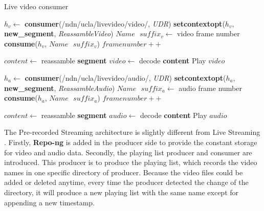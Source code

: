 \begin{algorithm}[hbtp]
\caption{Live video consumer}
\label{alg:liveconsumer}
\begin{algorithmic}[2]
\State $h_v \leftarrow $ \textbf{consumer}(/ndn/ucla/livevideo/video/, \textit{UDR})
\State \textbf{setcontextopt}($h_v$, \textbf{new\_segment}, \textit{ReassambleVideo})
\vspace{0.2cm}
	\State $Name \textbf{ } suffix_v \leftarrow $ video frame number
	\State \textbf{consume}($h_v$, $Name\textbf{ }suffix_v$)
	\State $framenumber ++$
	\EndWhile
\vspace{0.2cm}

    \State $content \leftarrow $ reassamble \textbf{segment}
		\State $video \leftarrow $ decode \textbf{content}
	   	\State Play $video$
	\EndIf
\EndFunction

\vspace{0.4cm}

\State $h_a \leftarrow $ \textbf{consumer}(/ndn/ucla/livevideo/audio/, \textit{UDR})
\State \textbf{setcontextopt}($h_a$, \textbf{new\_segment}, \textit{ReassambleAudio})
\vspace{0.2cm}
	\State $Name \textbf{ } suffix_a \leftarrow $ audio frame number
	\State \textbf{consume}($h_a$, $Name\textbf{ }suffix_a$)
	\State $framenumber ++$
	\EndWhile
\vspace{0.2cm}

    \State $content \leftarrow $ reassamble \textbf{segment}
		\State $audio \leftarrow $ decode \textbf{content}
	   	\State Play $audio$
	\EndIf
\EndFunction
\end{algorithmic}
\end{algorithm}



The Pre-recorded Streaming architecture is slightly different from Live Streaming . Firstly, \textbf{Repo-ng} is added in the producer side to provide the constant storage for video and audio data. Secondly, the playing list producer and consumer are introduced. This producer is to produce the playing list, which records the video names in one specific directory of producer. Because the video files could be added or deleted anytime, every time the producer detected the change of the directory, it will produce a new playing list with the same name except for appending a new timestamp.

